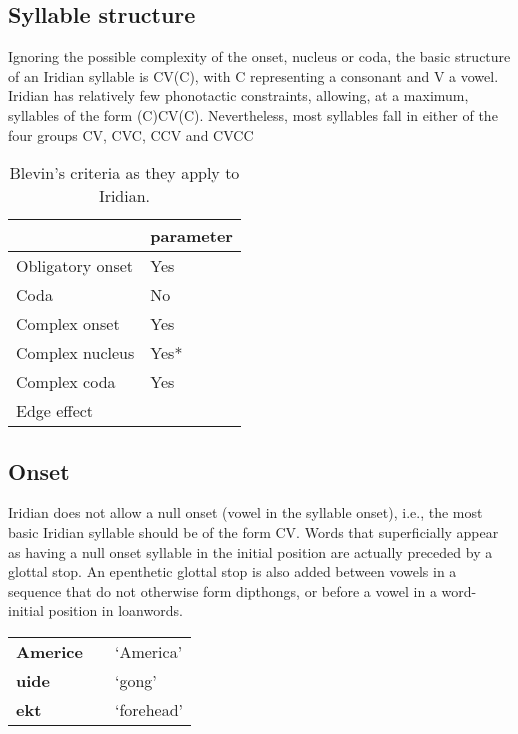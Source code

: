 \subsection{Syllable structure}

Ignoring the possible complexity of the onset, nucleus or coda, the basic structure of an Iridian syllable is CV(C), with C representing a consonant and V a vowel. Iridian has relatively few phonotactic constraints, allowing, at a maximum, syllables of the form (C)CV(C). Nevertheless, most syllables fall in either of the four groups CV, CVC, CCV and CVCC

\begin{table}[h!]
	\centering
	\caption{Blevin's criteria as they apply to Iridian.}
	\begin{tabularx}{0.6\textwidth}{YM}
		\toprule
		& {\sc parameter}\\
		\midrule
		Obligatory onset & Yes\\
		Coda & No\\
		Complex onset & Yes\\
		Complex nucleus & Yes*\\
		Complex coda & Yes\\
		Edge effect & \\
		\bottomrule
	\end{tabularx}
\end{table}


\subsection{Onset}

\par Iridian does not allow a null onset (vowel in the syllable onset), i.e., the most basic Iridian syllable should be of the form CV. Words that superficially appear as having a null onset syllable in the initial position are actually preceded by a glottal stop. An epenthetic glottal stop is also added between vowels in a sequence that do not otherwise form dipthongs, or before a vowel in a word-initial position in loanwords.

\begin{center} \small
	\begin{tabularx}{0.8\textwidth}{>{\bfseries}YYY}
		Americe &  &`America'\\
		uide&& `gong'\\
		ekt&&`forehead'\\
	\end{tabularx}
\end{center}

